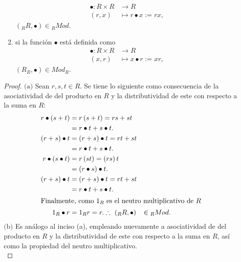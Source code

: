 \documentclass{article}
\newcommand{\lrprth}[1]{
    \left(#1\right)
}
\newcommand{\descapp}[6]{
    #1: #2 &\rightarrow #3\\
    #4 &\mapsto #5#6 
}
\theoremstyle{definition}
\theoremstyle{plain}
\theoremstyle{plain}
\theoremstyle{definition}
\theoremstyle{definition}
\theoremstyle{definition}
\theoremstyle{definition}
\theoremstyle{definition}
\theoremstyle{definition}
\begin{document}
\begin{enumerate}[label=\textbf{Ej \arabic*.}]
\begin{enumerate}[label=(\alph*)]
        \begin{align*}
            \descapp{\bullet}{R\times R}{R}{(r,x)}{r\bullet x:=rx}{,}
        \end{align*}
        $\lrprth{{}_RR,\bullet}\in {}_RMod$.
        \item si la función $\bullet$ está definida como
        \begin{align*}
            \descapp{\bullet}{R\times R}{R}{(x,r)}{x\bullet r:=xr}{,}
        \end{align*}
        $(R_R,\bullet)\in Mod_R$.
    \end{enumerate}
    \begin{proof}
    $\boxed{\text{(a)}}$ 
    Sean $r,s,t\in R$. Se tiene lo siguiente como consecuencia de la asociatividad de del producto en $R$ y la distributividad de este con respecto a la suma en $R$:
    \begin{align*}
        r\bullet\lrprth{s+t}&=r\lrprth{s+t}=rs+st\\
        &=r\bullet t + s\bullet t.\\
        \lrprth{r+s}\bullet t&=\lrprth{r+s}\bullet t=rt+st\\
        &=r\bullet t + s\bullet t.\\
        r\bullet\lrprth{s\bullet t}&=r\lrprth{st}=\lrprth{rs}t\\
        &=\lrprth{r\bullet s}\bullet t.\\
        \lrprth{r+s}\bullet t&=\lrprth{r+s}\bullet t=rt+st\\
        &=r\bullet t + s\bullet t.\\
        \intertext{Finalmente, como $1_R$ es el neutro multiplicativo de $R$}
        1_R\bullet r&= 1_Rr=r.
        \therefore \ \lrprth{{}_RR,\bullet}&\in {}_RMod.
    \end{align*}
    $\boxed{\text{(b)}}$ Es análogo al inciso (a), empleando nuevamente a asociatividad de del producto en $R$ y la distributividad de este con respecto a la suma en $R$, así como la propiedad del neutro multiplicativo. \\
    \end{proof}
\end{enumerate}
\end{document}
